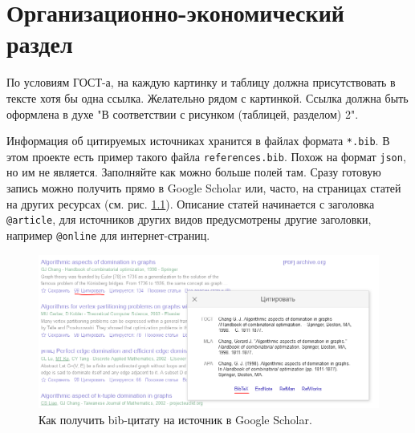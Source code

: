 \chapter{Организационно-экономический раздел}
\label{cha:econom}


По условиям ГОСТ-а, на каждую картинку и таблицу должна присутствовать в тексте хотя бы одна ссылка. Желательно рядом с картинкой. Ссылка должна быть оформлена в духе "{}В соответствии с рисунком (таблицей, разделом) 2"{}.

Информация об цитируемых источниках хранится в файлах формата \verb|*.bib|. В этом проекте есть пример такого файла \verb|references.bib|. Похож на формат \verb|json|, но им не является. Заполняйте как можно больше полей там. Сразу готовую запись можно получить прямо в Google Scholar или, часто, на страницах статей на других ресурсах (см. рис. \ref{fig:scholar}). Описание статей начинается с заголовка \verb|@article|, для источников других видов предусмотрены другие заголовки, например \verb|@online| для интернет-страниц.

\begin{figure}[ht]
    \centering
    \includegraphics[scale=0.5]{res/img/scholar.png}
    \caption{Как получить bib-цитату на источник в Google Scholar.}
    \label{fig:scholar}
\end{figure}

